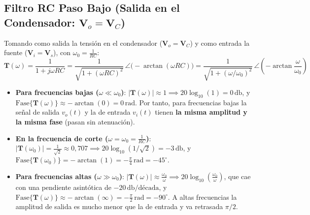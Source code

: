 \subsection{Filtro RC Paso Bajo (Salida en el Condensador: $\mathbf{V}_o = \mathbf{V}_C$)}
Tomando como salida la tensión en el condensador ($\mathbf{V}_o = \mathbf{V}_C$) y como entrada la fuente ($\mathbf{V}_i = \mathbf{V}_s$), con $\omega_0 = \frac{1}{RC}$:
\begin{equation}
    \mathbf{T}(\omega) = \frac{1}{1 + j\omega R C} = \frac{1}{\sqrt{1 + (\omega R C)^2}}\,\angle\big(-\arctan(\omega R C)\big) = \frac{1}{\sqrt{1 + (\omega/\omega_0)^2}}\,\angle\left(-\arctan\frac{\omega}{\omega_0}\right)
\end{equation}
\begin{itemize}
    \item \textbf{Para frecuencias bajas ($\omega \ll \omega_0$)}: $|\mathbf{T}(\omega)| \approx 1 \implies 20\log_{10}(1) = 0\,\si{\decibel}$, y $\text{Fase}\{\mathbf{T}(\omega)\} \approx -\arctan(0) = 0\,\si{\radian}$. Por tanto, para frecuencias bajas la señal de salida $v_o(t)$ y la de entrada $v_i(t)$ tienen \textbf{la misma amplitud y la misma fase} (pasan sin atenuación).
    \item \textbf{En la frecuencia de corte ($\omega = \omega_0 = \frac{1}{RC}$)}: $|\mathbf{T}(\omega_0)| = \frac{1}{\sqrt{2}} \approx 0{,}707 \implies 20\log_{10}(1/\sqrt{2}) = -3\,\si{\decibel}$, y $\text{Fase}\{\mathbf{T}(\omega_0)\} = -\arctan(1) = -\frac{\pi}{4}\,\si{\radian} = -45^\circ$.
    \item \textbf{Para frecuencias altas ($\omega \gg \omega_0$)}: $|\mathbf{T}(\omega)| \approx \frac{\omega_0}{\omega} \implies 20\log_{10}\left(\frac{\omega_0}{\omega}\right)$, que cae con una pendiente asintótica de \textbf{$-20\,\si{\decibel}/\text{década}$}, y $\text{Fase}\{\mathbf{T}(\omega)\} \approx -\arctan(\infty) = -\frac{\pi}{2}\,\si{\radian} = -90^\circ$. A altas frecuencias la amplitud de salida es mucho menor que la de entrada y va retrasada $\pi/2$.
\end{itemize}

